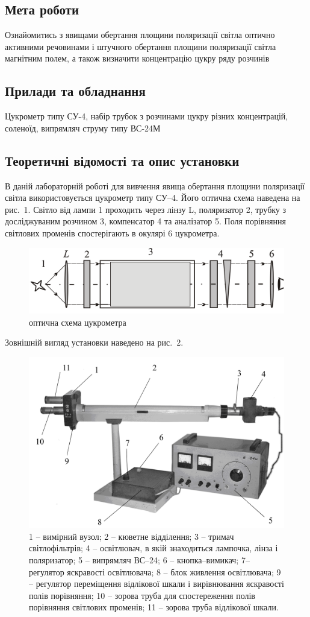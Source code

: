 \documentclass[12pt]{article}
\begin{document}

{\fontsize{14}{16.2}\selectfont

\subsection*{Мета роботи}
Ознайомитись з явищами обертання площини поляризації світла оптично
активними речовинами і штучного обертання площини поляризації світла
магнітним полем, а також визначити концентрацію цукру ряду розчинів

\subsection*{Прилади та обладнання}
Цукрометр типу СУ-4, набір трубок з розчинами цукру різних
концентрацій, соленоїд, випрямляч струму типу ВС-24М

\subsection*{Теоретичні відомості та опис установки}
В даній лабораторній роботі для вивчення явища обертання площини
поляризації світла використовується цукрометр типу СУ–4. Його
оптична схема наведена на рис. 1. Світло від лампи 1 проходить
через лінзу L, поляризатор 2, трубку з досліджуваним розчином 3,
компенсатор 4 та аналізатор 5. Поля порівняння світлових променів
спостерігають в окулярі 6 цукрометра.

\begin{figure}[h]
	\centering
	\includegraphics[width=.5\textwidth]{lens.png}
	\caption{оптична схема цукрометра}
\end{figure}

Зовнішній вигляд установки наведено на рис. 2.

\begin{figure}[h]
	\centering
	\includegraphics[width=.5\textwidth]{cukr.png}
	\caption{1 – вимірний вузол; 2 – кюветне відділення; 3 – тримач світлофільтрів; 4 – освітлювач, в якій знаходиться лампочка, лінза і поляризатор; 5 – випрямляч ВС–24; 6 – кнопка–вимикач; 7– регулятор яскравості освітлювача; 8 – блок живлення освітлювача; 9 – регулятор переміщення відлікової шкали і вирівнювання яскравості полів порівняння; 10 – зорова труба для спостереження полів порівняння світлових променів; 11 – зорова труба відлікової шкали.}
\end{figure}

}
\end{document}
